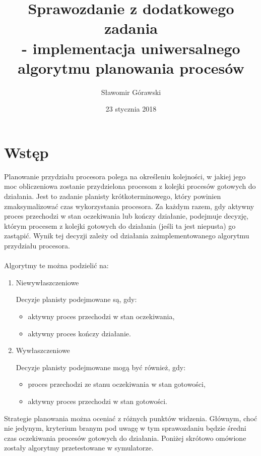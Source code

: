 \documentclass{article}
\title{Sprawozdanie z dodatkowego zadania\\ - implementacja uniwersalnego algorytmu planowania procesów}
\author{Sławomir Górawski}
\date{23 stycznia 2018}
\begin{document}
\maketitle

\section{Wstęp}

Planowanie przydziału procesora polega na określeniu kolejności, w jakiej jego moc obliczeniowa zostanie przydzielona procesom z kolejki procesów gotowych do działania. Jest to zadanie planisty krótkoterminowego, który powinien zmaksymalizować czas wykorzystania procesora. Za każdym razem, gdy aktywny proces przechodzi w stan oczekiwania lub kończy działanie, podejmuje decyzję, którym procesem z kolejki gotowych do działania (jeśli ta jest niepusta) go zastąpić. Wynik tej decyzji zależy od działania zaimplementowanego algorytmu przydziału procesora.
\\\\
Algorytmy te można podzielić na:

\begin{enumerate}
    \item Niewywłaszczeniowe
    
    Decyzje planisty podejmowane są, gdy:
    \begin{itemize}
        \item aktywny proces przechodzi w stan oczekiwania,
        \item aktywny proces kończy działanie.
    \end{itemize}
    
    \item Wywłaszczeniowe
    
    Decyzje planisty podejmowane mogą być również, gdy:
    \begin{itemize}
        \item proces przechodzi ze stanu oczekiwania w stan gotowości,
        \item aktywny proces przechodzi w stan gotowości.
    \end{itemize}
\end{enumerate}

Strategie planowania można oceniać z różnych punktów widzenia. Głównym, choć nie jedynym, kryterium branym pod uwagę w tym sprawozdaniu będzie średni czas oczekiwania procesów gotowych do działania. Poniżej skrótowo omówione zostały algorytmy przetestowane w symulatorze. 
\end{document}
